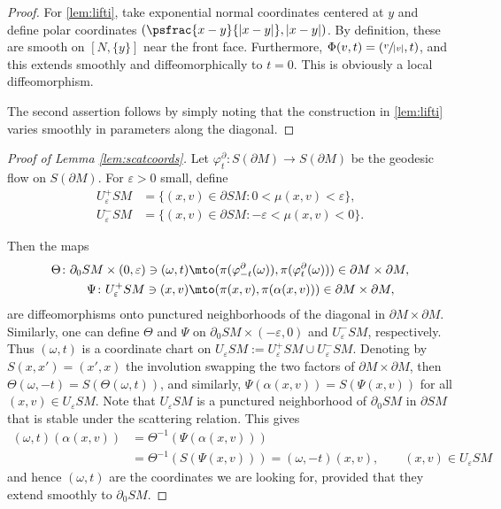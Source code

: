 \begin{proof} For \eqref{lem:lifti}, take exponential normal coordinates centered at $y$ and define \hbox{polar} coordinates $(\psfrac{x-y}{|x-y|}, |x-y|)$.
By definition, these are smooth on $[N,\{y\}]$ near the front face. Furthermore, $\Phi(v,t) = (\sfrac{v}{|v|},t)$, and this
extends smoothly and diffeomorphically to $t=0$. This is obviously a local diffeomorphism.

The second assertion follows by simply noting that the construction in \eqref{lem:lifti} varies smoothly in parameters along
the diagonal.
\end{proof}

\begin{proof}[Proof of Lemma \ref{lem:scatcoords}]
Let $\varphi_t^\partial\colon S(\partial M) \to S(\partial M)$ be the geodesic flow on $S(\partial M)$. For $\varepsilon > 0$ small,
define
\begin{align*}
U_\varepsilon^+ SM &= \{(x,v) \in \partial SM: 0 < \mu(x,v) < \varepsilon\}, \\
U_\varepsilon^- SM &= \{(x,v) \in \partial SM: -\varepsilon < \mu(x,v)
< 0\}.
\end{align*}

Then the maps
\begin{align*}
\Theta \colon \partial_0 SM\times (0,\varepsilon) \ni (\omega,t) &\mto (\pi (\varphi_{-t}^\partial (\omega)),
\pi (\varphi_{t}^\partial (\omega))) \in \partial M\times \partial M, \\
\Psi \colon U_\varepsilon^+SM \ni (x,v) &\mto (\pi(x,v), \pi (\alpha(x,v))) \in \partial M\times \partial M,
\end{align*}
are diffeomorphisms onto punctured neighborhoods of the diagonal in $\partial M\times \partial M$. Similarly, one can
define $\Theta$ and $\Psi$ on $\partial_0 SM\times (-\varepsilon,0)$ and $U_\varepsilon^- SM$, respectively. Thus
$(\omega,t)$ is a coordinate chart on $U_\varepsilon SM := U_\varepsilon^+ SM \cup U_\varepsilon^- SM$. Denoting by $S(x,x') = (x',x)$ the involution swapping the two factors of $\partial M\times \partial M$, then $\Theta(\omega,-t) = S(\Theta(\omega,t))$, and similarly, $\Psi(\alpha(x,v)) = S(\Psi (x,v))$ for all $(x,v)\in U_\varepsilon SM$. Note that $U_\varepsilon SM$ is a punctured neighborhood of $\partial_0 SM$ in $\partial SM$ that is stable under the scattering relation. This gives
\begin{equation}
\begin{split}
(\omega,t) (\alpha(x,v)) &= \Theta^{-1} (\Psi (\alpha(x,v))) \\
&= \Theta^{-1} (S(\Psi(x,v))) = (\omega,-t)(x,v), \qquad (x,v)\in U_\varepsilon SM
\end{split}
\label{eq:proptomega}
\end{equation}
and hence $(\omega,t)$ are the coordinates we are looking for, provided that they extend smoothly to $\partial_0 SM$.


\end{proof}
